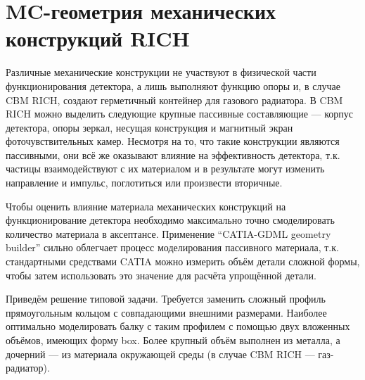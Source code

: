 \section{MC-геометрия механических конструкций RICH}\label{sec:secRICHgeoMech}

Различные механические конструкции не участвуют в физической части функционирования детектора, а лишь выполняют функцию опоры и, в случае CBM RICH, создают герметичный контейнер для газового радиатора. В CBM RICH можно выделить следующие крупные пассивные составляющие --- корпус детектора, опоры зеркал, несущая конструкция и магнитный экран фоточувствительных камер. Несмотря на то, что такие конструкции являются пассивными, они всё же оказывают влияние на эффективность детектора, т.к. частицы взаимодействуют с их материалом и в результате могут изменить направление и импульс, поглотиться или произвести вторичные.

Чтобы оценить влияние материала механических конструкций на функционирование детектора необходимо максимально точно смоделировать количество материала в аксептансе. Применение ``CATIA-GDML geometry builder'' сильно облегчает процесс моделирования пассивного материала, т.к. стандартными средствами CATIA можно измерить объём детали сложной формы, чтобы затем использовать это значение для расчёта упрощённой детали.

Приведём решение типовой задачи. Требуется заменить сложный профиль прямоугольным кольцом с совпадающими внешними размерами. Наиболее оптимально моделировать балку с таким профилем с помощью двух вложенных объёмов, имеющих форму box. Более крупный объём выполнен из металла, а дочерний --- из материала окружающей среды (в случае CBM RICH --- газ-радиатор).

